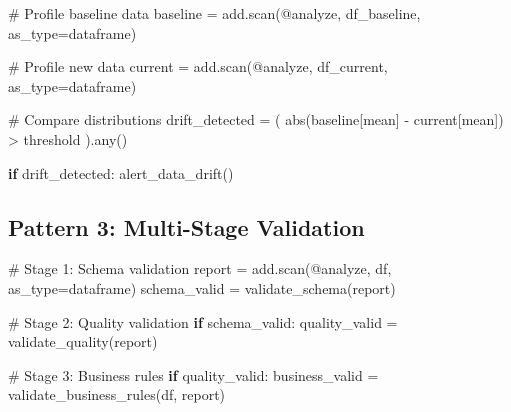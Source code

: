 \documentclass[
  letterpaper,
]{scrbook}
\newenvironment{Shaded}{\begin{snugshade}}{\end{snugshade}}
\newcommand{\BuiltInTok}[1]{\textcolor[rgb]{0.00,0.23,0.31}{#1}}
\newcommand{\CommentTok}[1]{\textcolor[rgb]{0.37,0.37,0.37}{#1}}
\newcommand{\ControlFlowTok}[1]{\textcolor[rgb]{0.00,0.23,0.31}{\textbf{#1}}}
\newcommand{\NormalTok}[1]{\textcolor[rgb]{0.00,0.23,0.31}{#1}}
\newcommand{\OperatorTok}[1]{\textcolor[rgb]{0.37,0.37,0.37}{#1}}
\newcommand{\StringTok}[1]{\textcolor[rgb]{0.13,0.47,0.30}{#1}}
\begin{document}
\begin{Shaded}
\begin{Highlighting}[]
\CommentTok{\# Profile baseline data}
\NormalTok{baseline }\OperatorTok{=}\NormalTok{ add.scan(}\StringTok{\textquotesingle{}@analyze\textquotesingle{}}\NormalTok{, df\_baseline, as\_type}\OperatorTok{=}\StringTok{\textquotesingle{}dataframe\textquotesingle{}}\NormalTok{)}

\CommentTok{\# Profile new data}
\NormalTok{current }\OperatorTok{=}\NormalTok{ add.scan(}\StringTok{\textquotesingle{}@analyze\textquotesingle{}}\NormalTok{, df\_current, as\_type}\OperatorTok{=}\StringTok{\textquotesingle{}dataframe\textquotesingle{}}\NormalTok{)}

\CommentTok{\# Compare distributions}
\NormalTok{drift\_detected }\OperatorTok{=}\NormalTok{ (}
    \BuiltInTok{abs}\NormalTok{(baseline[}\StringTok{\textquotesingle{}mean\textquotesingle{}}\NormalTok{] }\OperatorTok{{-}}\NormalTok{ current[}\StringTok{\textquotesingle{}mean\textquotesingle{}}\NormalTok{]) }\OperatorTok{\textgreater{}}\NormalTok{ threshold}
\NormalTok{).}\BuiltInTok{any}\NormalTok{()}

\ControlFlowTok{if}\NormalTok{ drift\_detected:}
\NormalTok{    alert\_data\_drift()}
\end{Highlighting}
\end{Shaded}

\subsection{Pattern 3: Multi-Stage
Validation}\label{pattern-3-multi-stage-validation}

\begin{Shaded}
\begin{Highlighting}[]
\CommentTok{\# Stage 1: Schema validation}
\NormalTok{report }\OperatorTok{=}\NormalTok{ add.scan(}\StringTok{\textquotesingle{}@analyze\textquotesingle{}}\NormalTok{, df, as\_type}\OperatorTok{=}\StringTok{\textquotesingle{}dataframe\textquotesingle{}}\NormalTok{)}
\NormalTok{schema\_valid }\OperatorTok{=}\NormalTok{ validate\_schema(report)}

\CommentTok{\# Stage 2: Quality validation}
\ControlFlowTok{if}\NormalTok{ schema\_valid:}
\NormalTok{    quality\_valid }\OperatorTok{=}\NormalTok{ validate\_quality(report)}
    
    \CommentTok{\# Stage 3: Business rules}
    \ControlFlowTok{if}\NormalTok{ quality\_valid:}
\NormalTok{        business\_valid }\OperatorTok{=}\NormalTok{ validate\_business\_rules(df, report)}
\end{Highlighting}
\end{Shaded}
\end{document}
